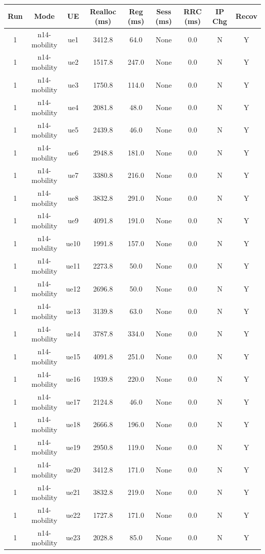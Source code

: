 \begin{table}[ht]
\centering
\begin{tabular}{|c|c|c|c|c|c|c|c|c|}
\hline
Run & Mode & UE & Realloc (ms) & Reg (ms) & Sess (ms) & RRC (ms) & IP Chg & Recov \\
\hline
1 & n14-mobility & ue1 & 3412.8 & 64.0 & None & 0.0 & N & Y \\
1 & n14-mobility & ue2 & 1517.8 & 247.0 & None & 0.0 & N & Y \\
1 & n14-mobility & ue3 & 1750.8 & 114.0 & None & 0.0 & N & Y \\
1 & n14-mobility & ue4 & 2081.8 & 48.0 & None & 0.0 & N & Y \\
1 & n14-mobility & ue5 & 2439.8 & 46.0 & None & 0.0 & N & Y \\
1 & n14-mobility & ue6 & 2948.8 & 181.0 & None & 0.0 & N & Y \\
1 & n14-mobility & ue7 & 3380.8 & 216.0 & None & 0.0 & N & Y \\
1 & n14-mobility & ue8 & 3832.8 & 291.0 & None & 0.0 & N & Y \\
1 & n14-mobility & ue9 & 4091.8 & 191.0 & None & 0.0 & N & Y \\
1 & n14-mobility & ue10 & 1991.8 & 157.0 & None & 0.0 & N & Y \\
1 & n14-mobility & ue11 & 2273.8 & 50.0 & None & 0.0 & N & Y \\
1 & n14-mobility & ue12 & 2696.8 & 50.0 & None & 0.0 & N & Y \\
1 & n14-mobility & ue13 & 3139.8 & 63.0 & None & 0.0 & N & Y \\
1 & n14-mobility & ue14 & 3787.8 & 334.0 & None & 0.0 & N & Y \\
1 & n14-mobility & ue15 & 4091.8 & 251.0 & None & 0.0 & N & Y \\
1 & n14-mobility & ue16 & 1939.8 & 220.0 & None & 0.0 & N & Y \\
1 & n14-mobility & ue17 & 2124.8 & 46.0 & None & 0.0 & N & Y \\
1 & n14-mobility & ue18 & 2666.8 & 196.0 & None & 0.0 & N & Y \\
1 & n14-mobility & ue19 & 2950.8 & 119.0 & None & 0.0 & N & Y \\
1 & n14-mobility & ue20 & 3412.8 & 171.0 & None & 0.0 & N & Y \\
1 & n14-mobility & ue21 & 3832.8 & 219.0 & None & 0.0 & N & Y \\
1 & n14-mobility & ue22 & 1727.8 & 171.0 & None & 0.0 & N & Y \\
1 & n14-mobility & ue23 & 2028.8 & 85.0 & None & 0.0 & N & Y \\

\end{tabular}
\end{table}
